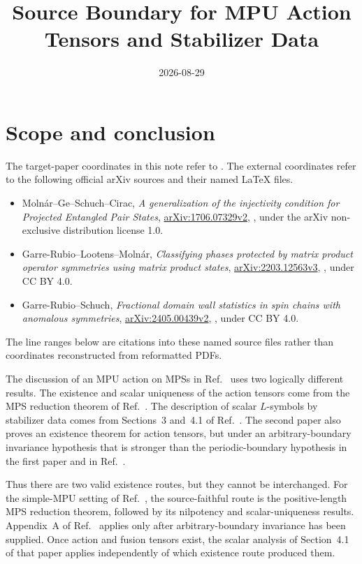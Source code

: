 \documentclass{article}
\title{Source Boundary for MPU Action Tensors and Stabilizer Data}
\author{}
\date{2026-08-29}
\begin{document}
\maketitle
{}

\section{Scope and conclusion}

The target-paper coordinates in this note refer to
.  The external coordinates refer to the
following official arXiv sources and their named \LaTeX{} files.
\begin{itemize}
    \item Moln\'ar--Ge--Schuch--Cirac, \emph{A generalization of the
          injectivity condition for Projected Entangled Pair States},
          \href{https://arxiv.org/abs/1706.07329v2}{arXiv:1706.07329v2},
          , under the arXiv non-exclusive distribution
          license 1.0.
    \item Garre-Rubio--Lootens--Moln\'ar, \emph{Classifying phases protected
          by matrix product operator symmetries using matrix product states},
          \href{https://arxiv.org/abs/2203.12563v3}{arXiv:2203.12563v3},
          , under CC BY 4.0.
    \item Garre-Rubio--Schuch, \emph{Fractional domain wall statistics in
          spin chains with anomalous symmetries},
          \href{https://arxiv.org/abs/2405.00439v2}{arXiv:2405.00439v2},
          , under CC BY 4.0.
\end{itemize}
The line ranges below are citations into these named source files rather than
coordinates reconstructed from reformatted PDFs.

The discussion of an MPU action on MPSs in
Ref.~\cite[lines~1782--1931]{FrancoRubio2025MPUGauging} uses two logically
different results.  The existence and scalar uniqueness of the action tensors
come from the MPS reduction theorem of
Ref.~\cite{Molnar2018SemiInjective}.  The description of scalar
$L$-symbols by stabilizer data comes from Sections~3 and~4.1 of
Ref.~\cite{GarreRubio2023MPOSym}.  The second paper also proves an existence
theorem for action tensors, but under an arbitrary-boundary invariance
hypothesis that is stronger than the periodic-boundary hypothesis in the
first paper and in Ref.~\cite{FrancoRubio2025MPUGauging}.

Thus there are two valid existence routes, but they cannot be interchanged.
For the simple-MPU setting of Ref.~\cite{FrancoRubio2025MPUGauging}, the
source-faithful route is the positive-length MPS reduction theorem, followed
by its nilpotency and scalar-uniqueness results.  Appendix~A of
Ref.~\cite{GarreRubio2023MPOSym} applies only after arbitrary-boundary
invariance has been supplied.  Once action and fusion tensors exist, the
scalar analysis of Section~4.1 of that paper applies independently of which
existence route produced them.
\end{document}
